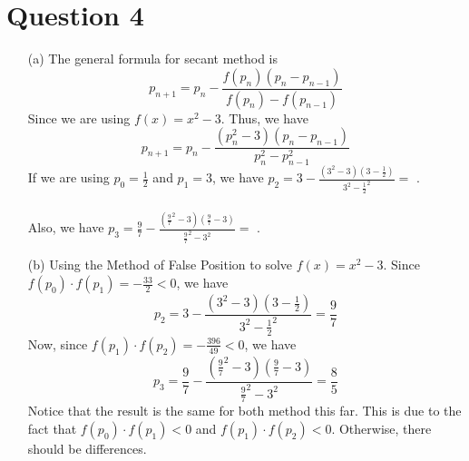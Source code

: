 \documentclass[11pt]{article}
\newcommand*{\boxtex}[1]{\framebox{#1}}
\begin{document}
\section*{Question 4}
\begin{itemize}
	\item [(a)]
	The general formula for secant method is 
	\[ p_{n+1} = p_n - \frac{f(p_n)(p_n-p_{n-1})}{f(p_n) - f(p_{n-1})} \]
	Since we are using $ f(x) = x^2 - 3 $. Thus, we have 
	\[ p_{n+1} = p_n - \frac{(p_n^2-3)(p_n-p_{n-1})}{p_n^2-p_{n-1}^2} \]
	If we are using $ p_0 = \frac{1}{2} $ and $ p_1 = 3 $, we have $ p_2 = 3 - \frac{(3^2-3)(3-\frac{1}{2})}{3^2-\frac{1}{2}^2} =$ \boxtex{$\frac{9}{7} $}.\\\\
	Also, we have $ p_3 = \frac{9}{7} - \frac{(\frac{9}{7}^2-3)(\frac{9}{7}-3)}{\frac{9}{7}^2-3^2} =$ \boxtex{$\frac{8}{5} $}.
	
	\item [(b)]
	Using the Method of False Position to solve $ f(x) = x^2 -3 $. Since $ f(p_0)\cdot f(p_1) = -\frac{33}{2} < 0 $, we have  
	\[ p_2 = 3 - \frac{(3^2-3)(3-\frac{1}{2})}{3^2-\frac{1}{2}^2} = \frac{9}{7} \]
	Now, since $ f(p_1)\cdot f(p_2) = -\frac{396}{49} < 0 $, we have 
	\[ p_3 = \frac{9}{7} - \frac{(\frac{9}{7}^2-3)(\frac{9}{7}-3)}{\frac{9}{7}^2-3^2} = \frac{8}{5} \]
	Notice that the result is the same for both method this far. This is due to the fact that  $ f(p_0)\cdot f(p_1) < 0$ and $ f(p_1)\cdot f(p_2) < 0 $. Otherwise, there should be differences. \pagebreak
\end{itemize}
\end{document}
